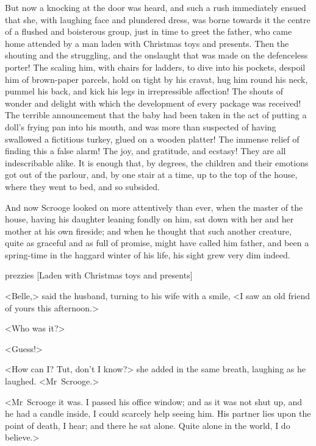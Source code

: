 But now a knocking at the door was heard, and such a rush immediately ensued that she, with laughing face and plundered dress, was borne towards it the centre of a flushed and boisterous group, just in time to greet the father, who came home attended by a man laden with Christmas toys and presents. Then the shouting and the struggling, and the onslaught that was made on the defenceless porter! The scaling him, with chairs for ladders, to dive into his pockets, despoil him of brown-paper parcels, hold on tight by his cravat, hug him round his neck, pummel his back, and kick his legs in irrepressible affection! The shouts of wonder and delight with which the development of every package was received! The terrible announcement that the baby had been taken in the act of putting a doll's frying pan into his mouth, and was more than suspected of having swallowed a fictitious turkey, glued on a wooden platter! The immense relief of finding this a false alarm! The joy, and gratitude, and ecstasy! They are all indescribable alike. It is enough that, by degrees, the children and their emotions got out of the parlour, and, by one stair at a time, up to the top of the house, where they went to bed, and so subsided.

And now Scrooge looked on more attentively than ever, when the master of the house, having his daughter leaning fondly on him, sat down with her and her mother at his own fireside; and when he thought that such another creature, quite as graceful and as full of promise, might have called him father, and been a spring-time in the haggard winter of his life, his sight grew very dim indeed.

\begin{colorbigpic}
	[\basicscale]
	{prezzies}
	[Laden with Christmas toys and presents]
\end{colorbigpic}


<Belle,> said the husband, turning to his wife with a smile, <I saw an old friend of yours this afternoon.>

<Who was it?>

<Guess!>

<How can I\@? Tut, don't I know?> she added in the same breath, laughing as he laughed. <Mr~Scrooge.>

<Mr~Scrooge it was. I passed his office window; and as it was not shut up, and he had a candle inside, I could scarcely help seeing him. His partner lies upon the point of death, I hear; and there he sat alone. Quite alone in the world, I do believe.>

